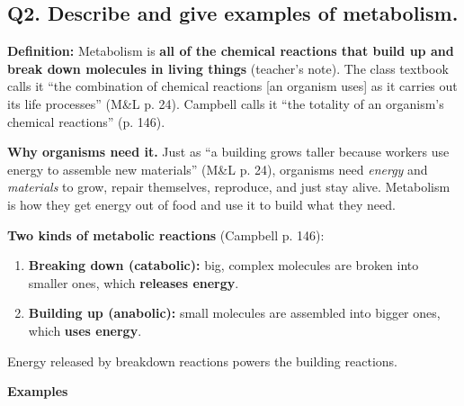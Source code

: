 \documentclass[11pt,letterpaper]{article}
\begin{document}
\subsection{Q2. Describe and give examples of metabolism.}

\textbf{Definition:} Metabolism is \textbf{all of the chemical reactions that build up and break down molecules in living things} (teacher's note). The class textbook calls it ``the combination of chemical reactions [an organism uses] as it carries out its life processes'' (M\&L p. 24). Campbell calls it ``the totality of an organism's chemical reactions'' (p. 146).

\textbf{Why organisms need it.} Just as ``a building grows taller because workers use energy to assemble new materials'' (M\&L p. 24), organisms need \emph{energy} and \emph{materials} to grow, repair themselves, reproduce, and just stay alive. Metabolism is how they get energy out of food and use it to build what they need.

\textbf{Two kinds of metabolic reactions} (Campbell p. 146):
\begin{enumerate}
  \item \textbf{Breaking down (catabolic):} big, complex molecules are broken into smaller ones, which \textbf{releases energy}.
  \item \textbf{Building up (anabolic):} small molecules are assembled into bigger ones, which \textbf{uses energy}.
\end{enumerate}

Energy released by breakdown reactions powers the building reactions.

\textbf{Examples}
\end{document}
